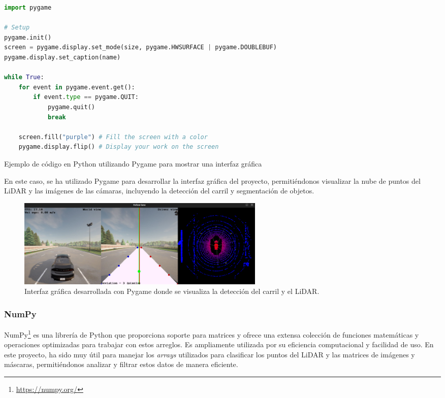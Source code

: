 \begin{code}[h]
\begin{lstlisting}[language=Python]
import pygame

# Setup
pygame.init()
screen = pygame.display.set_mode(size, pygame.HWSURFACE | pygame.DOUBLEBUF)
pygame.display.set_caption(name)

while True:
	for event in pygame.event.get():
		if event.type == pygame.QUIT:
			pygame.quit()
			break

	screen.fill("purple") # Fill the screen with a color
	pygame.display.flip() # Display your work on the screen
\end{lstlisting}
\caption[Ejemplo de código en Python utilizando Pygame]{Ejemplo de código en Python utilizando Pygame para mostrar una interfaz gráfica}
\label{cod:pygame}
\end{code}

En este caso, se ha utilizado Pygame para desarrollar la interfaz gráfica del proyecto, permitiéndonos visualizar la nube de puntos del \ac{LiDAR} y las imágenes de las cámaras, incluyendo la detección del carril y segmentación de objetos.

\begin{figure}[ht]
\begin{center}
\includegraphics[width=12cm]{figs/Plataformas_Desarollo/pygame.png}
\end{center}
\caption{Interfaz gráfica desarrollada con Pygame donde se visualiza la detección del carril y el \ac{LiDAR}.}
\label{foto_pygame}
\end{figure}

\subsubsection{NumPy}
\label{sec:numpy}

NumPy\footnote{\url{https://numpy.org/}} es una librería de Python que proporciona soporte para matrices y ofrece una extensa colección de funciones matemáticas y operaciones optimizadas para trabajar con estos arreglos. Es ampliamente utilizada por su eficiencia computacional y facilidad de uso. En este proyecto, ha sido muy útil para manejar los \textit{arrays} utilizados para clasificar los puntos del \ac{LiDAR} y las matrices de imágenes y máscaras, permitiéndonos analizar y filtrar estos datos de manera eficiente.

